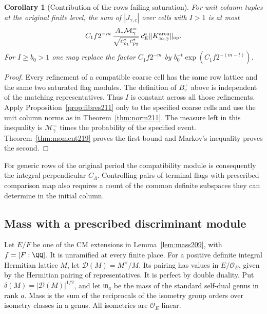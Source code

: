 \documentclass[a4paper,11pt]{article}
\newtheorem{corollary}[proposition]{Corollary}
\theoremstyle{definition}
\theoremstyle{remark}
\numberwithin{equation}{section}
\newcommand{\OO}{\mathcal O}
\begin{document}
\begin{corollary}[Contribution of the rows failing saturation]
\label{cor:bad219}
For unit column tuples at the original finite level, the sum
of \(|J_{\gamma,c}|\) over cells with \(I>1\) is at most
\[
 C_1 f2^{-m}\,
 \frac{A_*\mathcal M_\gamma^{=}}{\sqrt{c_{\rho_1}^*c_{\rho_2}^*}}\,
                  c_E^a\|K_{\infty,\gamma}^{\rm area}\|_{\rm op}.
\]
For \(I\ge b_0>1\) one may replace the factor \(C_1 f2^{-m}\) by
\(b_0^{-t}\exp(C_1f2^{-(m-t)})\).
\end{corollary}
\begin{proof}
Every refinement of a compatible coarse cell has the same row
lattice and the same two saturated flag modules. The definition
of \(B_v^+\) above is independent of the matching representatives.
Thus \(I\) is constant across all those refinements.
Apply Proposition~\ref{prop:fibres211} only to the specified
coarse cells and use the unit column norms as in
Theorem~\ref{thm:norm211}. The measure left in this inequality
is \(\mathcal M_\gamma^{=}\) times the probability of the
specified event. Theorem~\ref{thm:moment219} proves the first
bound and Markov's inequality proves the second.
\end{proof}

For generic rows of the original period the compatibility module
is consequently the integral perpendicular \(C_\Lambda\).
Controlling pairs of terminal flags with prescribed comparison
map also requires a count of the common definite subspaces they
can determine in the initial column.

\subsection{Mass with a prescribed discriminant module}\label{nav:IX-11}
\label{sec:discmass221}

Let \(E/F\) be one of the CM extensions in
Lemma~\ref{lem:mass209}, with \(f=[F:\QQ]\). It is unramified
at every finite place. For a positive definite integral
Hermitian lattice \(M\), let \(\mathcal D(M)=M^\vee/M\).
Its pairing has values in \(E/\OO_E\), given by the Hermitian
pairing of representatives. It is perfect by double duality.
Put \(\delta(M)=|\mathcal D(M)|^{1/2}\), and let
\(\mathfrak m_a\) be the mass of the standard self-dual
genus in rank \(a\). Mass is the sum of the reciprocals of
the isometry group orders over isometry classes in a genus.
All isometries are \(\OO_E\)-linear.
\end{document}
